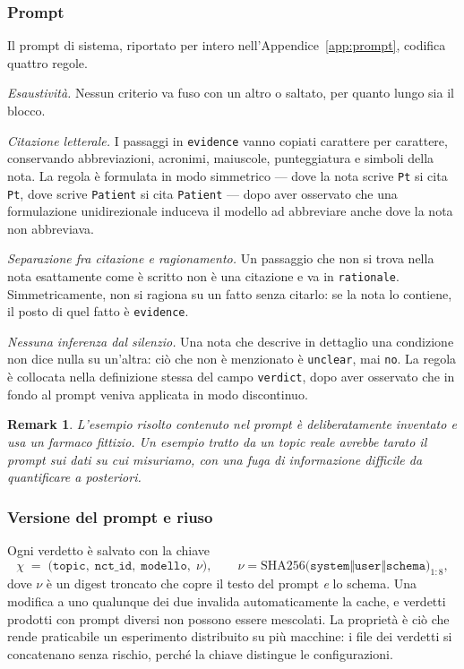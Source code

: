 \documentclass[pdflatex,sn-mathphys-num]{sn-jnl}
\theoremstyle{thmstyleone}
\theoremstyle{thmstyletwo}
\newtheorem{remark}{Remark}
\theoremstyle{thmstylethree}
\begin{document}
\subsubsection{Prompt}\label{sec:prompt}

Il prompt di sistema, riportato per intero nell'Appendice~\ref{app:prompt}, codifica quattro regole.

\emph{Esaustività.} Nessun criterio va fuso con un altro o saltato, per quanto lungo sia il blocco.

\emph{Citazione letterale.} I passaggi in \texttt{evidence} vanno copiati carattere per carattere, conservando abbreviazioni, acronimi, maiuscole, punteggiatura e simboli della nota. La regola è formulata in modo simmetrico --- dove la nota scrive \texttt{Pt} si cita \texttt{Pt}, dove scrive \texttt{Patient} si cita \texttt{Patient} --- dopo aver osservato che una formulazione unidirezionale induceva il modello ad abbreviare anche dove la nota non abbreviava.

\emph{Separazione fra citazione e ragionamento.} Un passaggio che non si trova nella nota esattamente come è scritto non è una citazione e va in \texttt{rationale}. Simmetricamente, non si ragiona su un fatto senza citarlo: se la nota lo contiene, il posto di quel fatto è \texttt{evidence}.

\emph{Nessuna inferenza dal silenzio.} Una nota che descrive in dettaglio una condizione non dice nulla su un'altra: ciò che non è menzionato è \texttt{unclear}, mai \texttt{no}. La regola è collocata nella definizione stessa del campo \texttt{verdict}, dopo aver osservato che in fondo al prompt veniva applicata in modo discontinuo.

\begin{remark}
L'esempio risolto contenuto nel prompt è deliberatamente \emph{inventato} e usa un farmaco fittizio. Un esempio tratto da un topic reale avrebbe tarato il prompt sui dati su cui misuriamo, con una fuga di informazione difficile da quantificare a posteriori.
\end{remark}

\subsubsection{Versione del prompt e riuso}\label{sec:versione}

Ogni verdetto è salvato con la chiave
\begin{equation}
  \chi \;=\; \big(\texttt{topic}, \;\texttt{nct\_id}, \;\texttt{modello}, \;\nu\big),
  \qquad
  \nu = \mathrm{SHA256}\big(\texttt{system} \Vert \texttt{user} \Vert \texttt{schema}\big)_{1:8},
  \label{eq:chiave}
\end{equation}
dove $\nu$ è un digest troncato che copre il testo del prompt \emph{e} lo schema. Una modifica a uno qualunque dei due invalida automaticamente la cache, e verdetti prodotti con prompt diversi non possono essere mescolati. La proprietà è ciò che rende praticabile un esperimento distribuito su più macchine: i file dei verdetti si concatenano senza rischio, perché la chiave distingue le configurazioni.
\end{document}
